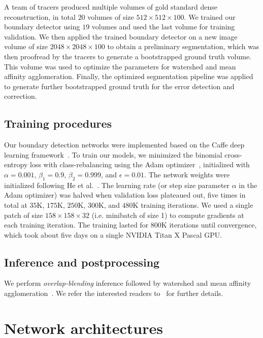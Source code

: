 \documentclass{article}
\begin{document}
\begin{appendices}
A team of tracers produced multiple volumes of gold standard dense reconstruction, in total $20$ volumes of size $512 \times 512 \times 100$. We trained our boundary detector using $19$ volumes and used the last volume for training validation. We then applied the trained boundary detector on a new image volume of size $2048 \times 2048 \times 100$ to obtain a preliminary segmentation, which was then proofread by the tracers to generate a bootstrapped ground truth volume. This volume was used to optimize the parameters for watershed and mean affinity agglomeration. Finally, the optimized segmentation pipeline was applied to generate further bootstrapped ground truth for the error detection and correction.

\subsection{Training procedures}
Our boundary detection networks were implemented based on the Caffe deep
learning framework~\cite{jia2014caffe}. To train our models, we minimized the
binomial cross-entropy loss with class-rebalancing using the Adam
optimizer~\cite{adam}, initialized with $\alpha=0.001$, $\beta_1=0.9$,
$\beta_2=0.999$, and $\epsilon=0.01$. The network weights were initialized
following He et al.~\cite{he2015delving}. The learning rate (or step size
parameter $\alpha$ in the Adam optimizer) was halved when validation loss
plateaued out, five times in total at $35$K, $175$K, $250$K, $300$K, and
$480$K training iterations. We used a single patch of size
$158\times158\times32$ (i.e. minibatch of size 1) to compute gradients at each
training iteration. The training lasted for $800$K iterations until convergence,
which took about five days on a single NVIDIA Titan X Pascal GPU.

\subsection{Inference and postprocessing}
We perform \emph{overlap-blending} inference followed by watershed and mean affinity agglomeration~\cite{kisuk}. We refer the interested readers to~\cite{kisuk} for further details.

\section{Network architectures}
\label{appendix:architecture}


\end{appendices}
\end{document}
